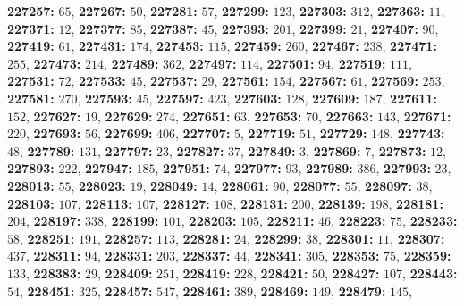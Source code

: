 \textsf{\bfseries 227257:} $65$, \textsf{\bfseries 227267:} $50$, \textsf{\bfseries 227281:} $57$, \textsf{\bfseries 227299:} $123$, \textsf{\bfseries 227303:} $312$, \textsf{\bfseries 227363:} $11$, \textsf{\bfseries 227371:} $12$, \textsf{\bfseries 227377:} $85$, \textsf{\bfseries 227387:} $45$, \textsf{\bfseries 227393:} $201$, \textsf{\bfseries 227399:} $21$, \textsf{\bfseries 227407:} $90$, \textsf{\bfseries 227419:} $61$, \textsf{\bfseries 227431:} $174$, \textsf{\bfseries 227453:} $115$, \textsf{\bfseries 227459:} $260$, \textsf{\bfseries 227467:} $238$, \textsf{\bfseries 227471:} $255$, \textsf{\bfseries 227473:} $214$, \textsf{\bfseries 227489:} $362$, \textsf{\bfseries 227497:} $114$, \textsf{\bfseries 227501:} $94$, \textsf{\bfseries 227519:} $111$, \textsf{\bfseries 227531:} $72$, \textsf{\bfseries 227533:} $45$, \textsf{\bfseries 227537:} $29$, \textsf{\bfseries 227561:} $154$, \textsf{\bfseries 227567:} $61$, \textsf{\bfseries 227569:} $253$, \textsf{\bfseries 227581:} $270$, \textsf{\bfseries 227593:} $45$, \textsf{\bfseries 227597:} $423$, \textsf{\bfseries 227603:} $128$, \textsf{\bfseries 227609:} $187$, \textsf{\bfseries 227611:} $152$, \textsf{\bfseries 227627:} $19$, \textsf{\bfseries 227629:} $274$, \textsf{\bfseries 227651:} $63$, \textsf{\bfseries 227653:} $70$, \textsf{\bfseries 227663:} $143$, \textsf{\bfseries 227671:} $220$, \textsf{\bfseries 227693:} $56$, \textsf{\bfseries 227699:} $406$, \textsf{\bfseries 227707:} $5$, \textsf{\bfseries 227719:} $51$, \textsf{\bfseries 227729:} $148$, \textsf{\bfseries 227743:} $48$, \textsf{\bfseries 227789:} $131$, \textsf{\bfseries 227797:} $23$, \textsf{\bfseries 227827:} $37$, \textsf{\bfseries 227849:} $3$, \textsf{\bfseries 227869:} $7$, \textsf{\bfseries 227873:} $12$, \textsf{\bfseries 227893:} $222$, \textsf{\bfseries 227947:} $185$, \textsf{\bfseries 227951:} $74$, \textsf{\bfseries 227977:} $93$, \textsf{\bfseries 227989:} $386$, \textsf{\bfseries 227993:} $23$, \textsf{\bfseries 228013:} $55$, \textsf{\bfseries 228023:} $19$, \textsf{\bfseries 228049:} $14$, \textsf{\bfseries 228061:} $90$, \textsf{\bfseries 228077:} $55$, \textsf{\bfseries 228097:} $38$, \textsf{\bfseries 228103:} $107$, \textsf{\bfseries 228113:} $107$, \textsf{\bfseries 228127:} $108$, \textsf{\bfseries 228131:} $200$, \textsf{\bfseries 228139:} $198$, \textsf{\bfseries 228181:} $204$, \textsf{\bfseries 228197:} $338$, \textsf{\bfseries 228199:} $101$, \textsf{\bfseries 228203:} $105$, \textsf{\bfseries 228211:} $46$, \textsf{\bfseries 228223:} $75$, \textsf{\bfseries 228233:} $58$, \textsf{\bfseries 228251:} $191$, \textsf{\bfseries 228257:} $113$, \textsf{\bfseries 228281:} $24$, \textsf{\bfseries 228299:} $38$, \textsf{\bfseries 228301:} $11$, \textsf{\bfseries 228307:} $437$, \textsf{\bfseries 228311:} $94$, \textsf{\bfseries 228331:} $203$, \textsf{\bfseries 228337:} $44$, \textsf{\bfseries 228341:} $305$, \textsf{\bfseries 228353:} $75$, \textsf{\bfseries 228359:} $133$, \textsf{\bfseries 228383:} $29$, \textsf{\bfseries 228409:} $251$, \textsf{\bfseries 228419:} $228$, \textsf{\bfseries 228421:} $50$, \textsf{\bfseries 228427:} $107$, \textsf{\bfseries 228443:} $54$, \textsf{\bfseries 228451:} $325$, \textsf{\bfseries 228457:} $547$, \textsf{\bfseries 228461:} $389$, \textsf{\bfseries 228469:} $149$, \textsf{\bfseries 228479:} $145$, 
